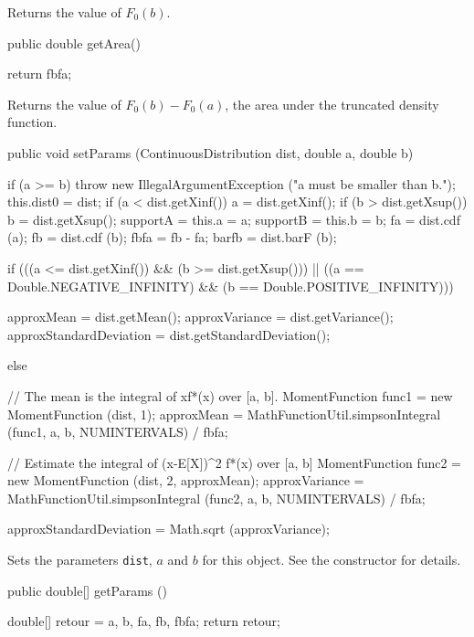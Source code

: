 \begin{tabb}   Returns the value of $F_0(b)$.
\end{tabb}
\begin{code}

   public double getArea()\begin{hide} {
      return fbfa;
   }
\end{hide}
\end{code}
\begin{tabb}  Returns the value of $F_0(b) - F_0(a)$,
  the area under the truncated density function.
\end{tabb}
\begin{code}

   public void setParams (ContinuousDistribution dist, double a, double b)\begin{hide} {
      if (a >= b)
         throw new IllegalArgumentException ("a must be smaller than b.");
      this.dist0 = dist;
      if (a < dist.getXinf())
         a = dist.getXinf();
      if (b > dist.getXsup())
         b = dist.getXsup();
      supportA = this.a = a;
      supportB = this.b = b;
      fa = dist.cdf (a);
      fb = dist.cdf (b);
      fbfa = fb - fa;
      barfb = dist.barF (b);

      if (((a <= dist.getXinf()) && (b >= dist.getXsup())) ||
       ((a == Double.NEGATIVE_INFINITY) && (b == Double.POSITIVE_INFINITY))) {
         approxMean = dist.getMean();
         approxVariance = dist.getVariance();
         approxStandardDeviation = dist.getStandardDeviation();

      } else {
         // The mean is the integral of xf*(x) over [a, b].
         MomentFunction func1 = new MomentFunction (dist, 1);
         approxMean = MathFunctionUtil.simpsonIntegral (func1, a, b, NUMINTERVALS) / fbfa;

         // Estimate the integral of (x-E[X])^2 f*(x) over [a, b]
         MomentFunction func2 = new MomentFunction (dist, 2, approxMean);
         approxVariance = MathFunctionUtil.simpsonIntegral (func2, a, b, NUMINTERVALS) / fbfa;

         approxStandardDeviation = Math.sqrt (approxVariance);
      }
   }\end{hide}
\end{code}
\begin{tabb}  Sets the parameters \texttt{dist}, $a$ and $b$ for this object. See the
  constructor for details.
\end{tabb}
\begin{code}

   public double[] getParams ()\begin{hide} {
      double[] retour = {a, b, fa, fb, fbfa};
      return retour;
   }\end{hide}
\end{code}
